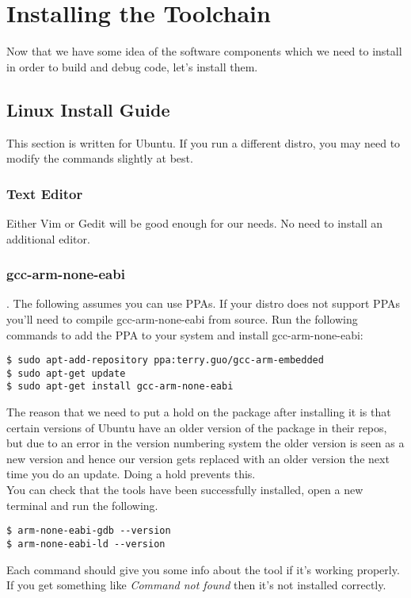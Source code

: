\chapter{Installing the Toolchain}
Now that we have some idea of the software components which we need to install in order to build and debug code, let's install them.

\section{Linux Install Guide}
This section is written for Ubuntu. If you run a different distro, you may need to modify the commands slightly at best.
\subsection{Text Editor}
Either Vim or Gedit will be good enough for our needs. No need to install an additional editor.

\subsection{gcc-arm-none-eabi}.
The following assumes you can use PPAs. If your distro does not support PPAs you'll need to compile gcc-arm-none-eabi from source.
Run the following commands to add the PPA to your system and install gcc-arm-none-eabi:
\begin{lstlisting}[style=BashStyle]
$ sudo apt-add-repository ppa:terry.guo/gcc-arm-embedded
$ sudo apt-get update
$ sudo apt-get install gcc-arm-none-eabi
\end{lstlisting}
The reason that we need to put a hold on the package after installing it is that certain versions of Ubuntu have an older version of the package in their repos, but due to an error in the version numbering system the older version is seen as a new version and hence our version gets replaced with an older version the next time you do an update. Doing a hold prevents this. \\

You can check that the tools have been successfully installed, open a new terminal and run the following. 
\begin{lstlisting}[style=BashStyle]
$ arm-none-eabi-gdb --version
$ arm-none-eabi-ld --version
\end{lstlisting}
Each command should give you some info about the tool if it's working properly. If you get something like \textit{Command not found} then it's not installed correctly.

